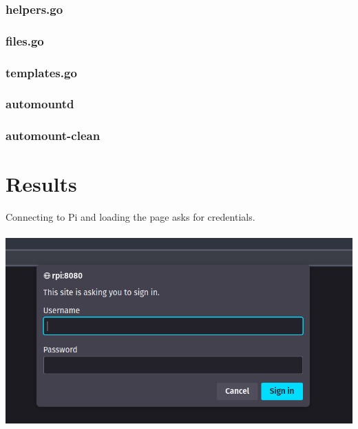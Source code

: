 \documentclass[12pt]{article}
\begin{document}
\subsubsection{helpers.go}


\subsubsection{files.go}


\subsubsection{templates.go}


\lstset{language=Bash}

\subsubsection{automountd}


\subsubsection{automount-clean}



\fi  %


\fontsize{12pt}{24pt}\selectfont

\iftrue  %

\section{Results}

Connecting to Pi and loading the page asks for credentials. \\ \\
\includegraphics[width=\linewidth]{ss/1.cm-login.png} \\
\end{document}
